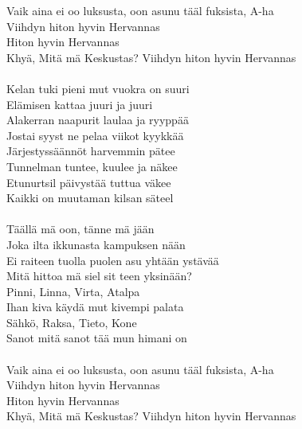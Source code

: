 
            Vaik aina ei oo luksusta, oon asunu tääl fuksista, A-ha \\
            Viihdyn hiton hyvin Hervannas  \\
            Hiton hyvin Hervannas  \\
            Khyä, Mitä mä Keskustas? Viihdyn hiton hyvin Hervannas \\
\hspace{10mm} \\
            Kelan tuki pieni mut vuokra on suuri  \\
            Elämisen kattaa juuri ja juuri  \\
            Alakerran naapurit laulaa ja ryyppää \\
            Jostai syyst ne pelaa viikot kyykkää \\
            Järjestyssäännöt harvemmin pätee \\
            Tunnelman tuntee, kuulee ja näkee \\
            Etunurtsil päivystää tuttua väkee \\
            Kaikki on muutaman kilsan säteel \\
\hspace{10mm} \\
            Täällä mä oon, tänne mä jään \\
            Joka ilta ikkunasta kampuksen nään \\
            Ei raiteen tuolla puolen asu yhtään ystävää \\
            Mitä hittoa mä siel sit teen yksinään? \\
            Pinni, Linna, Virta, Atalpa  \\
            Ihan kiva käydä mut kivempi palata \\
            Sähkö, Raksa, Tieto, Kone \\
            Sanot mitä sanot tää mun himani on \\
\hspace{10mm} \\
            Vaik aina ei oo luksusta, oon asunu tääl fuksista, A-ha \\
            Viihdyn hiton hyvin Hervannas \\
            Hiton hyvin Hervannas  \\
            Khyä, Mitä mä Keskustas? Viihdyn hiton hyvin Hervannas \\

